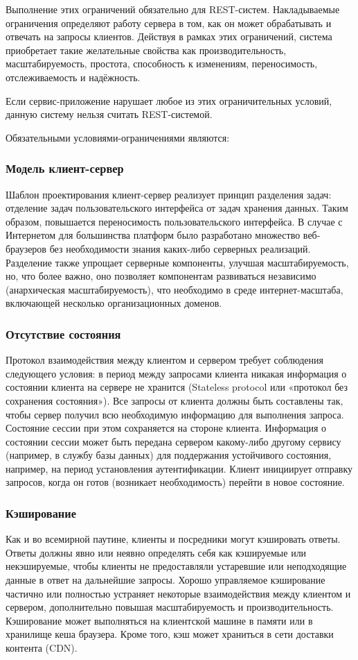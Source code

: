 \documentclass[a4page]{article}
\begin{document}
Выполнение этих ограничений обязательно для REST-систем.
Накладываемые ограничения определяют работу сервера в том,
как он может обрабатывать и отвечать на запросы клиентов.
Действуя в рамках этих ограничений,
система приобретает такие желательные свойства как производительность,
масштабируемость, простота, способность к изменениям, переносимость, отслеживаемость и надёжность.

Если сервис-приложение нарушает любое из этих ограничительных условий,
данную систему нельзя считать REST-системой.

Обязательными условиями-ограничениями являются:

\subsubsection{Модель клиент-сервер}
Шаблон проектирования клиент-сервер реализует принцип разделения задач:
отделение задач пользовательского интерфейса от задач хранения данных.
Таким образом, повышается переносимость пользовательского интерфейса.
В случае с Интернетом для большинства платформ было разработано множество веб-браузеров
без необходимости знания каких-либо серверных реализаций.
Разделение также упрощает серверные компоненты, улучшая масштабируемость,
но, что более важно, оно позволяет компонентам развиваться независимо (анархическая масштабируемость),
что необходимо в среде интернет-масштаба, включающей несколько организационных доменов.

\subsubsection{Отсутствие состояния}
Протокол взаимодействия между клиентом и сервером требует соблюдения следующего условия:
в период между запросами клиента никакая информация о состоянии клиента на сервере не хранится
(Stateless protocol или «протокол без сохранения состояния»).
Все запросы от клиента должны быть составлены так,
чтобы сервер получил всю необходимую информацию для выполнения запроса.
Состояние сессии при этом сохраняется на стороне клиента.
Информация о состоянии сессии может быть передана сервером какому-либо другому сервису
(например, в службу базы данных) для поддержания устойчивого состояния,
например, на период установления аутентификации.
Клиент инициирует отправку запросов, когда он готов (возникает необходимость) перейти в новое состояние.

\subsubsection{Кэширование}
Как и во всемирной паутине, клиенты и посредники могут кэшировать ответы.
Ответы должны явно или неявно определять себя как кэшируемые или некэшируемые,
чтобы клиенты не предоставляли устаревшие или неподходящие данные в ответ на дальнейшие запросы.
Хорошо управляемое кэширование частично или полностью устраняет некоторые взаимодействия
между клиентом и сервером, дополнительно повышая масштабируемость и производительность.
Кэширование может выполняться на клиентской машине в памяти или в хранилище кеша браузера.
Кроме того, кэш может храниться в сети доставки контента (CDN).
\end{document}
